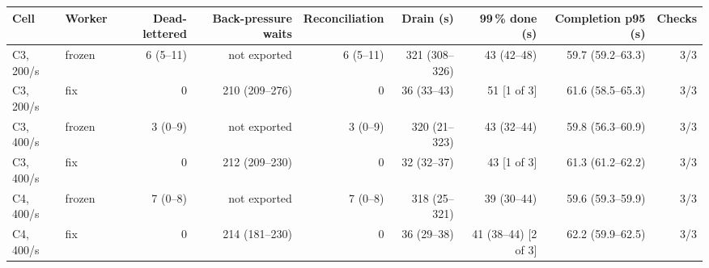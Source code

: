\begin{tabular}{llrrrrrrr}
\toprule
Cell & Worker & Dead-lettered & Back-pressure waits & Reconciliation & Drain (s) & 99\,\% done (s) & Completion p95 (s) & Checks \\
\midrule
C3, 200/s & frozen & 6 (5--11) & not exported & 6 (5--11) & 321 (308--326) & 43 (42--48) & 59.7 (59.2--63.3) & 3/3 \\
C3, 200/s & fix & 0 & 210 (209--276) & 0 & 36 (33--43) & 51 [1 of 3] & 61.6 (58.5--65.3) & 3/3 \\
\addlinespace[2pt]
C3, 400/s & frozen & 3 (0--9) & not exported & 3 (0--9) & 320 (21--323) & 43 (32--44) & 59.8 (56.3--60.9) & 3/3 \\
C3, 400/s & fix & 0 & 212 (209--230) & 0 & 32 (32--37) & 43 [1 of 3] & 61.3 (61.2--62.2) & 3/3 \\
\addlinespace[2pt]
C4, 400/s & frozen & 7 (0--8) & not exported & 7 (0--8) & 318 (25--321) & 39 (30--44) & 59.6 (59.3--59.9) & 3/3 \\
C4, 400/s & fix & 0 & 214 (181--230) & 0 & 36 (29--38) & 41 (38--44) [2 of 3] & 62.2 (59.9--62.5) & 3/3 \\
\bottomrule
\end{tabular}
